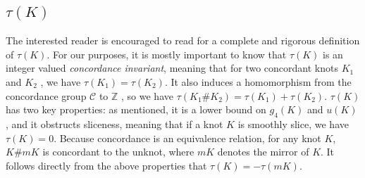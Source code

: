\documentclass[reqno, 12pt]{amsart}
\theoremstyle{remark}
\begin{document}
\subsection{$\tau(K)$}
The interested reader is encouraged to read \cite[Section~1]{Ozsv_th_2003} for a complete and rigorous definition of $\tau(K)$. For our purposes, it is mostly important to know that $\tau(K)$ is an integer valued \textit{concordance invariant}, meaning that for two concordant knots $K_1$ and $K_2$ , we have $\tau(K_1) = \tau(K_2)$. It also induces a homomorphism from the concordance group $\mathcal{C}$ to $\mathbb{Z}$ \cite[Theorem~1.2]{Ozsv_th_2003}, so we have $\tau(K_1 \# K_2) = \tau(K_1) + \tau(K_2)$.  $\tau(K)$ has two key properties: as mentioned, it is a lower bound on $g_4(K)$ and $u(K)$ \cite[Corollary~1.3]{Ozsv_th_2003}, and it obstructs sliceness, meaning that if a knot $K$ is smoothly slice, we have $\tau(K) = 0$. Because concordance is an equivalence relation, for any knot $K$, $K \# mK$ is concordant to the unknot, where $mK$ denotes the mirror of $K$. It follows directly from the above properties that $\tau(K) = -\tau(mK)$.
\end{document}
